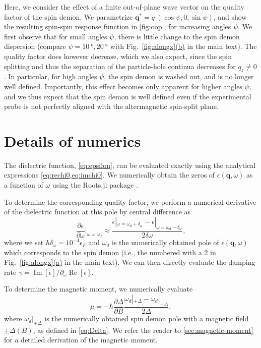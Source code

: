 \documentclass[aps,prb,reprint,twocolumns,superscriptaddress,nofootinbib]{revtex4-2}
\DeclareMathOperator{\Imm}{Im}
\DeclareMathOperator{\Ree}{Re}
\newcommand{\subfigref}[2]{Fig.~\hyperref[#1]{\ref*{#1}#2}}
\begin{document}
	Here, we consider the effect of a finite out-of-plane wave vector on the quality factor of the spin demon. We parametrize $\bm q^* = q\ (\cos\psi,0,\sin\psi)$, and show the resulting spin-spin response function in \cref{fig:oop}, for increasing angles $\psi$. We first observe that for small angles $\psi$, there is little change to the spin demon dispersion (compare $\psi=\SI{10}{\degree},\SI{20}{\degree}$ with \subfigref{fig:alongx}{(b)} in the main text). The quality factor does however decrease, which we also expect, since the spin splitting and thus the separation of the particle-hole continua decreases for $q_z\neq0$. In particular, for high angles $\psi$, the spin demon is washed out, and is no longer well defined. Importantly, this effect becomes only apparent for higher angles $\psi$, and we thus expect that the spin demon is well defined even if the experimental probe is not perfectly aligned with the altermagnetic spin-split plane.
	
	
	
	\section{Details of numerics}
	\label{sec:numerics}
	The dielectric function, \cref{eq:epsilon}, can be evaluated exactly using the analytical expressions \cref{eq:rechi0,eq:imchi0}. We  numerically obtain the zeros of $\epsilon(\bm q,\omega)$ as a function of $\omega$ using the Roots.jl package \cite{Roots.jl}.
	
	
	To determine the corresponding quality factor, we perform a numerical derivative of the dielectric function at this pole by central difference as
	\begin{equation}
		\frac{\partial\epsilon}{\partial\omega}\big|_{\omega=\omega_{d}} \approx \frac{\epsilon|_{\omega=\omega_{d}+\delta_\omega}-\epsilon|_{\omega=\omega_{d}-\delta_\omega}}{2\delta\omega},
	\end{equation}
	where we set $\hbar\delta_\omega=10^{-4}\epsilon_F$ and $\omega_d$ is the numerically obtained pole of $\epsilon(\bm q,\omega)$ which corresponds to the spin demon (i.e., the numbered with a 2 in \subfigref{fig:alongx}{(a)} in the main text). We can then directly evaluate the damping rate $\gamma=\Imm[\epsilon]/\partial_\omega\Ree[\epsilon]$.
	
	To determine the magnetic moment, we numerically evaluate
	\begin{equation}
		\mu = -\hbar\frac{\partial\Delta}{\partial B} \frac{\omega_d|_{+\Delta}-\omega_d|_{-\Delta}}{2\Delta},
	\end{equation}
	where $\omega_d|_{\pm\Delta}$ is the numerically obtained spin demon pole with a magnetic field $\pm\Delta(B)$, as defined in \cref{eq:Delta}. We refer the reader to  \cref{sec:magnetic-moment} for a detailed derivation of the magnetic moment.
	
\end{document}
